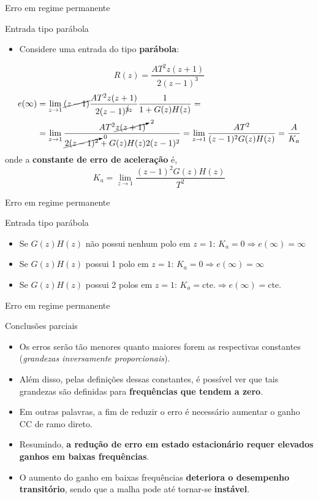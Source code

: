 \begin{frame}{Erro em regime permanente}
\begin{block}{Entrada tipo parábola}
\begin{itemize}
    \item Considere uma entrada do tipo \textbf{parábola}:
\end{itemize}
$$R(z)=\dfrac{AT^{2}z(z+1)}{2(z-1)^{3}}$$
	\begin{align*}
	e(\infty)&=\lim\limits_{z\to1}\cancel{(z-1)}\frac{AT^{2}z(z+1)}{2(z-1)^{\cancel{3} {\scriptscriptstyle 2}}}\frac{1}{1+G(z)H(z)}=\\
	&=\lim\limits_{z\to1}\dfrac{AT^{2}\cancelto{2}{z(z+1)}}{\cancelto{0}{2(z-1)^{2}}+G(z)H(z)2(z-1)^{2}}=\lim\limits_{z\to1}\dfrac{AT^{2}}{(z-1)^{2}G(z)H(z)}=
	\dfrac{A}{K_a}
	\end{align*}
	onde a \textbf{constante de erro de aceleração} é,
	\[ \boxed{K_a=\lim\limits_{z\to1}\frac{(z-1)^{2}G(z)H(z)}{T^{2}}} \] 
\end{block}
\end{frame}

\begin{frame}{Erro em regime permanente}
\begin{block}{Entrada tipo parábola}
	\begin{itemize}
		\item Se $ G(z)H(z) $ não possui nenhum polo em $ z=1 $: $ K_a= 0 \Rightarrow e(\infty)=\infty $
		\item Se $ G(z)H(z) $ possui 1 polo em $ z=1 $: $ K_a = 0 \Rightarrow e(\infty) = \infty $
		\item Se $ G(z)H(z) $ possui 2 polos em $ z=1 $: $ K_a = \text{cte.} \Rightarrow e(\infty) = \text{cte.}$
	\end{itemize}
\end{block}
\end{frame}

\begin{frame}{Erro em regime permanente}
\begin{block}{Conclusões parciais}
	\begin{itemize}
		\item Os erros serão tão menores quanto maiores forem as respectivas constantes (\textit{grandezas inversamente proporcionais}).
		\item Além disso, pelas definições dessas constantes, é possível ver que tais grandezas são definidas para \textbf{frequências que tendem a zero}.
		\item Em  outras palavras, a fim de reduzir o erro é necessário aumentar o ganho CC de ramo direto.
		\item Resumindo, \textbf{a redução de  erro em estado estacionário requer elevados ganhos em baixas frequências}.
		\item O aumento do ganho em baixas frequências \textbf{deteriora o desempenho transitório}, sendo que a malha pode até tornar-se \textbf{instável}.
	\end{itemize}
\end{block}
\end{frame}

